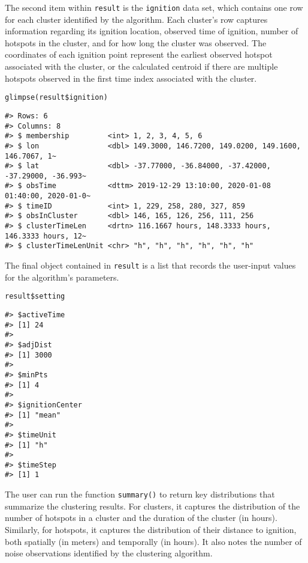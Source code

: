 The second item within \texttt{result} is the \texttt{ignition} data set, which contains one row for each cluster identified by the algorithm. Each cluster's row captures information regarding its ignition location, observed time of ignition, number of hotspots in the cluster, and for how long the cluster was observed. The coordinates of each ignition point represent the earliest observed hotspot associated with the cluster, or the calculated centroid if there are multiple hotspots observed in the first time index associated with the cluster.

\begin{verbatim}
glimpse(result$ignition)
\end{verbatim}

\begin{verbatim}
#> Rows: 6
#> Columns: 8
#> $ membership         <int> 1, 2, 3, 4, 5, 6
#> $ lon                <dbl> 149.3000, 146.7200, 149.0200, 149.1600, 146.7067, 1~
#> $ lat                <dbl> -37.77000, -36.84000, -37.42000, -37.29000, -36.993~
#> $ obsTime            <dttm> 2019-12-29 13:10:00, 2020-01-08 01:40:00, 2020-01-0~
#> $ timeID             <int> 1, 229, 258, 280, 327, 859
#> $ obsInCluster       <dbl> 146, 165, 126, 256, 111, 256
#> $ clusterTimeLen     <drtn> 116.1667 hours, 148.3333 hours, 146.3333 hours, 12~
#> $ clusterTimeLenUnit <chr> "h", "h", "h", "h", "h", "h"
\end{verbatim}

The final object contained in \texttt{result} is a list that records the user-input values for the algorithm's parameters.

\begin{verbatim}
result$setting
\end{verbatim}

\begin{verbatim}
#> $activeTime
#> [1] 24
#> 
#> $adjDist
#> [1] 3000
#> 
#> $minPts
#> [1] 4
#> 
#> $ignitionCenter
#> [1] "mean"
#> 
#> $timeUnit
#> [1] "h"
#> 
#> $timeStep
#> [1] 1
\end{verbatim}

The user can run the function \texttt{summary()} to return key distributions that summarize the clustering results. For clusters, it captures the distribution of the number of hotspots in a cluster and the duration of the cluster (in hours). Similarly, for hotspots, it captures the distribution of their distance to ignition, both spatially (in meters) and temporally (in hours). It also notes the number of noise observations identified by the clustering algorithm.

